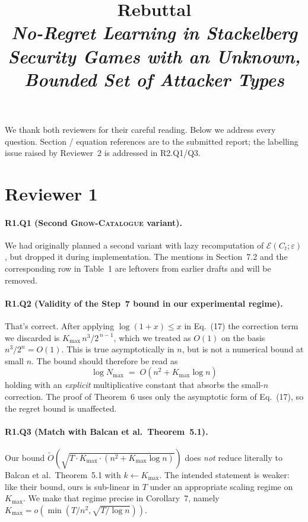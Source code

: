 \documentclass[11pt]{article}
\title{Rebuttal\\\large \emph{No-Regret Learning in Stackelberg Security
Games with an Unknown, Bounded Set of Attacker Types}}
\author{}
\date{}
\begin{document}
\maketitle
\vspace{-2em}

\noindent We thank both reviewers for their careful reading. Below we address every
question. Section / equation references are to the submitted report;
the labelling issue raised by Reviewer~2 is addressed in R2.Q1/Q3.

\section*{Reviewer 1}

\paragraph{R1.Q1 (Second \textsc{Grow-Catalogue} variant).}
We had originally planned a second variant with lazy recomputation of
$\mathcal E(C_t;\varepsilon)$, but dropped it during implementation.
The mentions in Section~7.2 and the corresponding row in Table~1 are
leftovers from earlier drafts and will be removed.

\paragraph{R1.Q2 (Validity of the Step~7 bound in our experimental regime).}
That's correct. After applying $\log(1+x)\le x$ in Eq.~(17) the
correction term we discarded is $K_{\max}\,n^{3}/2^{\,n-1}$, which we
treated as $O(1)$ on the basis $n^{3}/2^{n}=O(1)$. This is true
asymptotically in $n$, but is not a numerical bound at small $n$. The bound should therefore be read as
\[
\log N_{\max} \;=\; O\!\left(n^{2}+K_{\max}\log n\right)
\]
holding with an \emph{explicit} multiplicative constant that
absorbs the small-$n$ correction. The proof of Theorem~6 uses only the
asymptotic form of Eq.~(17), so the regret bound is unaffected.

\paragraph{R1.Q3 (Match with Balcan et al.\ Theorem~5.1).}
Our bound
$\widetilde O\!\left(\sqrt{T\cdot K_{\max}\cdot(n^{2}+K_{\max}\log n)}\right)$
does \emph{not} reduce literally to Balcan et al.\ Theorem~5.1 with
$k\!\leftarrow\!K_{\max}$. The intended statement is weaker: like
their bound, ours is sub-linear in $T$ under an appropriate scaling
regime on $K_{\max}$. We make that regime precise in Corollary~7,
namely $K_{\max}=o\!\left(\min(T/n^{2},\sqrt{T/\log n})\right)$. 
\end{document}
